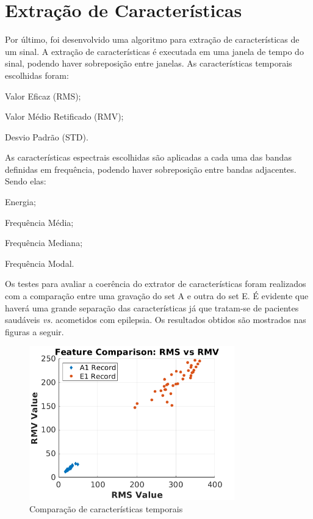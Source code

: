 \documentclass{article}
\begin{document}
\section{Extração de Características}
Por último, foi desenvolvido uma algoritmo para extração de características de um sinal. A extração de características é executada em uma janela de tempo do sinal, podendo haver sobreposição entre janelas. As características temporais escolhidas foram:
\begin{enumerate*}[label=(\roman*)]
	\item Valor Eficaz (RMS);
	\item Valor Médio Retificado (RMV);
	\item Desvio Padrão (STD).
\end{enumerate*}
As características espectrais escolhidas são aplicadas a cada uma das bandas definidas em frequência, podendo haver sobreposição entre bandas adjacentes. Sendo elas:
\begin{enumerate*}[label=(\roman*)]
	\item Energia;
	\item Frequência Média;
	\item Frequência Mediana;
	\item Frequência Modal.
\end{enumerate*}

Os testes para avaliar a coerência do extrator de características foram realizados com a comparação entre uma gravação do set A e outra do set E. É evidente que haverá uma grande separação das características já que tratam-se de pacientes saudáveis \textit{vs.} acometidos com epilepsia. Os resultados obtidos são mostrados nas figuras a seguir.

\begin{figure}[h]
	\begin{center}
		\includegraphics[width=3.5in]{Figures/rms_rmv.png}
		\caption{Comparação de características temporais}
		\label{fig:tf}
	\end{center}
\end{figure}
\end{document}
